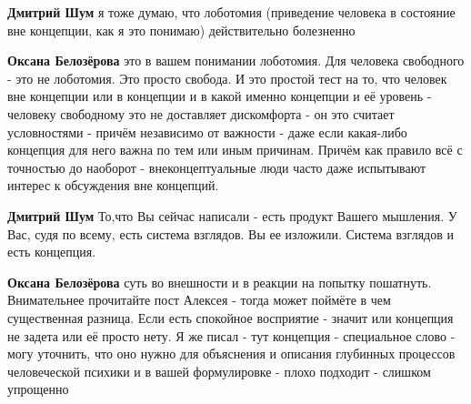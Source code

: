 \begin{itemize}
\begin{itemize}
\textbf{Дмитрий Шум} я тоже думаю, что лоботомия (приведение человека в состояние вне концепции, как я это понимаю) действительно болезненно

 
\textbf{Оксана Белозёрова} это в вашем понимании лоботомия. Для человека
свободного - это не лоботомия. Это просто свобода. И это простой тест на то,
что человек вне концепции или в концепции и в какой именно концепции и её
уровень - человеку свободному это не доставляет дискомфорта - он это считает
условностями - причём независимо от важности - даже если какая-либо концепция
для него важна по тем или иным причинам. Причём как правило всё с точностью до
наоборот - внеконцептуальные люди часто даже испытывают интерес к обсуждения
вне концепций.

 
\textbf{Дмитрий Шум} То,что Вы сейчас написали - есть продукт Вашего мышления.
У Вас, судя по всему, есть система взглядов. Вы ее изложили. Система взглядов и
есть концепция.

 
\textbf{Оксана Белозёрова} суть во внешности и в реакции на попытку пошатнуть.
Внимательнее прочитайте пост Алексея - тогда может поймёте в чем существенная
разница. Если есть спокойное восприятие - значит или концепция не задета или её
просто нету. Я же писал - тут концепция - специальное слово - могу уточнить,
что оно нужно для объяснения и описания глубинных процессов человеческой
психики и в вашей формулировке - плохо подходит - слишком упрощенно

 

\end{itemize}
\end{itemize}
